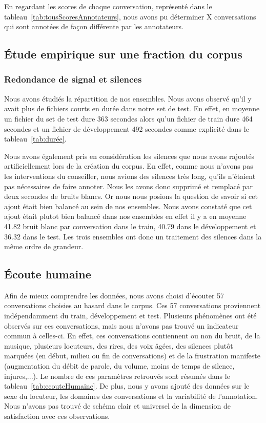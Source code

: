 En regardant les scores de chaque conversation, représenté dans le tableau~\ref{tab:tousScoresAnnotateurs}, nous avons pu déterminer X conversations qui sont annotées de façon différente par les annotateurs.



\subsection{Étude empirique sur une fraction du corpus}

\subsubsection{Redondance de signal et silences}
Nous avons étudiés la répartition de nos ensembles. Nous avons observé qu'il y avait plus de fichiers courts en durée dans notre set de test. En effet, en moyenne un fichier du set de test dure 363 secondes alors qu'un fichier de train dure 464 secondes et un fichier de développement 492 secondes comme explicité dans le tableau~\ref{tab:durée}.


Nous avons également pris en considération les silences que nous avons rajoutés artificiellement lors de la création du corpus. En effet, comme nous n'avons pas les interventions du conseiller, nous avions des silences très long, qu'ils n'étaient pas nécessaires de faire annoter. Nous les avons donc supprimé et remplacé par deux secondes de bruits blancs. Or nous nous posions la question de savoir si cet ajout était bien balancé au sein de nos ensembles. Nous avons constaté que cet ajout était plutot bien balancé dans nos ensembles en effet il y a en moyenne 41.82 bruit blanc par conversation dans le train, 40.79 dans le développement et 36.32 dans le test.
Les trois ensembles ont donc un traitement des silences dans la même ordre de grandeur.

\subsection{Écoute humaine}
Afin de mieux comprendre les données, nous avons choisi d'écouter 57 conversations choisies au hasard dans le corpus. Ces 57 conversations proviennent indépendamment du train, développement et test.
Plusieurs phénomènes ont été observés sur ces conversations, mais nous n'avons pas trouvé un indicateur commun à celles-ci. En effet, ces conversations contiennent ou non du bruit, de la musique, plusieurs locuteurs, des rires, des voix âgées, des silences plutôt marquées (en début, milieu ou fin de conversations) et de la frustration manifeste (augmentation du débit de parole, du volume, moins de temps de silence, injures,...). Le nombre de ces paramètres retrouvés sont résumés dans le tableau~\ref{tab:ecouteHumaine}. De plus, nous y avons ajouté des données sur le sexe du locuteur, les domaines des conversations et la variabilité de l'annotation.
Nous n'avons pas trouvé de schéma clair et universel de la dimension de satisfaction avec ces observations.

